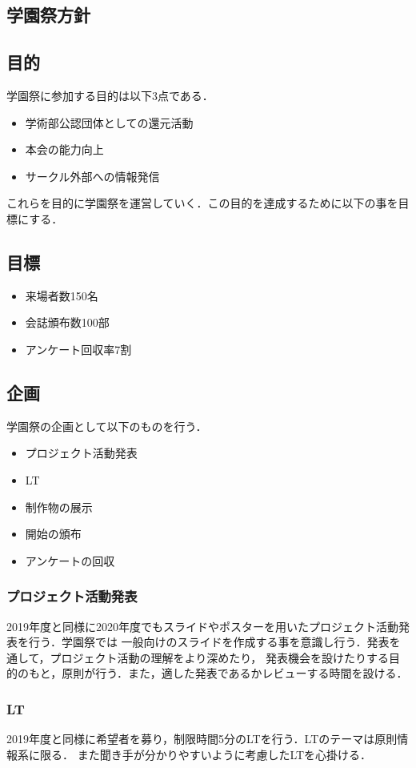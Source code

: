 \subsection*{学園祭方針}


\subsection*{目的}
学園祭に参加する目的は以下3点である．
\begin{itemize}
    \item 学術部公認団体としての還元活動
    \item 本会の能力向上
    \item サークル外部への情報発信
\end{itemize}
これらを目的に学園祭を運営していく．この目的を達成するために以下の事を目標にする．
\subsection*{目標}
\begin{itemize}
    \item 来場者数150名
    \item 会誌頒布数100部
    \item アンケート回収率7割
\end{itemize}
\subsection*{企画}
学園祭の企画として以下のものを行う．
\begin{itemize}
    \item プロジェクト活動発表
    \item LT
    \item 制作物の展示
    \item 開始の頒布
    \item アンケートの回収
\end{itemize}
\subsubsection*{プロジェクト活動発表}
2019年度と同様に2020年度でもスライドやポスターを用いたプロジェクト活動発表を行う．学園祭では
一般向けのスライドを作成する事を意識し行う．発表を通して，プロジェクト活動の理解をより深めたり，
発表機会を設けたりする目的のもと，原則\firstGrade{}が行う．また，適した発表であるかレビューする時間を設ける．

\subsubsection*{LT}
2019年度と同様に希望者を募り，制限時間5分のLTを行う．LTのテーマは原則情報系に限る．
また聞き手が分かりやすいように考慮したLTを心掛ける．

